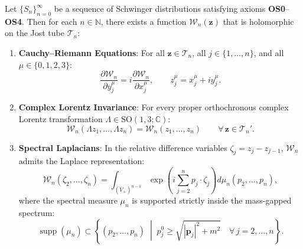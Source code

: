 \begin{theorem}
\label{thm:jost_tube_continuation}
Let $\{S_n\}_{n=0}^\infty$ be a sequence of Schwinger distributions satisfying axioms \textbf{OS0}--\textbf{OS4}. Then for each $n \in \mathbb{N}$, there exists a function $\mathcal{W}_n(\mathbf{z})$ that is holomorphic on the Jost tube $\mathcal{T}_n$:
\begin{enumerate}
    \item \textbf{Cauchy--Riemann Equations}: For all $\mathbf{z} \in \mathcal{T}_n$, all $j \in \{1, \dots, n\}$, and all $\mu \in \{0, 1, 2, 3\}$:
    \begin{equation}
    \label{eq:cauchy_riemann_system}
    \frac{\partial \mathcal{W}_n}{\partial y_j^\mu} = i \frac{\partial \mathcal{W}_n}{\partial x_j^\mu}, \qquad z_j^\mu = x_j^\mu + i y_j^\mu.
    \end{equation}
    \item \textbf{Complex Lorentz Invariance}: For every proper orthochronous complex Lorentz transformation $\Lambda \in \mathrm{SO}(1, 3; \mathbb{C})$:
    \begin{equation}
    \mathcal{W}_n(\Lambda z_1, \dots, \Lambda z_n) = \mathcal{W}_n(z_1, \dots, z_n) \qquad \forall \, \mathbf{z} \in \mathcal{T}_n'.
    \end{equation}
    \item \textbf{Spectral Laplacians}: In the relative difference variables $\zeta_j = z_j - z_{j-1}$, $\mathcal{W}_n$ admits the Laplace representation:
    \begin{equation}
    \label{eq:laplace_representation}
    \mathcal{W}_n(\zeta_2, \dots, \zeta_n) = \int_{(\overline{V}_+)^{n-1}} \exp\left( i \sum_{j=2}^n p_j \cdot \zeta_j \right) d\mu_n(p_2, \dots, p_n),
    \end{equation}
    where the spectral measure $\mu_n$ is supported strictly inside the mass-gapped spectrum:
    \begin{equation}
    \operatorname{supp}(\mu_n) \subset \left\{ (p_2, \dots, p_n) \;\middle|\; p_j^0 \ge \sqrt{|\mathbf{p}_j|^2 + m^2} \quad \forall \, j = 2, \dots, n \right\}.
    \end{equation}
\end{enumerate}
\end{theorem}

